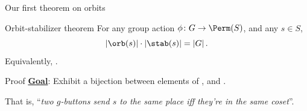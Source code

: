 \documentclass[8pt, handout]{beamer}
\newcommand{\Pause}{}      %
\begin{document}
\begin{frame}{Our first theorem on orbits} 
  
  \begin{block}{Orbit-stabilizer theorem}
    For any group action $\phi\colon G\to\Perm(S)$, and any $s\in S$,
    \[
    |\orb(s)|\cdot|\stab(s)|=|G|\,.
    \]
    Equivalently, .
  \end{block}
  
  \Pause
  
  \begin{exampleblock}{Proof} %
    \underline{\textbf{Goal}}: Exhibit a bijection between elements of
    , and . 
    
    \medskip\Pause 
    
    That is, ``\emph{two $g$-buttons send $s$ to the same place iff
      they're in the same coset}''.
    
    \vspace{-3mm}\Pause 
    

\end{exampleblock}
\end{frame}
\end{document}
